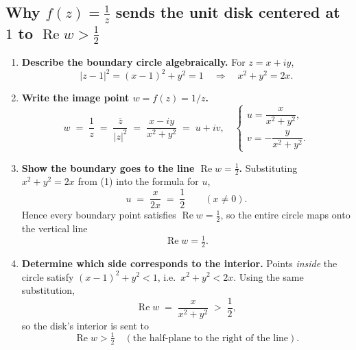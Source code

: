 \documentclass[12pt]{article}
\title{}
\author{Jerich Lee}
\date{\today}
\theoremstyle{definition} %
\theoremstyle{plain} %
\begin{document}
\maketitle

\subsection*{Why \(f(z)=\tfrac1z\) sends the unit disk centered at \(1\) to
\(\operatorname{Re} w > \tfrac12\)}

\begin{enumerate}
\item \textbf{Describe the boundary circle algebraically.}  
      For \(z=x+iy\),
      \[
        \lvert z-1\rvert^2 = (x-1)^2 + y^2 = 1
        \quad\Longrightarrow\quad
        x^2 + y^2 = 2x. \tag{1}
      \]

\item \textbf{Write the image point \(w=f(z)=1/z\).}  
      \[
        w \;=\; \frac1z \;=\; \frac{\bar z}{|z|^2} 
        \;=\; \frac{x-iy}{x^2+y^2}
        \;=\; u + iv,
        \quad
        \begin{cases}
          u = \dfrac{x}{x^2+y^2},\\[6pt]
          v = -\dfrac{y}{x^2+y^2}.
        \end{cases}
      \]

\item \textbf{Show the boundary goes to the line \(\operatorname{Re} w=\tfrac12\).}  
      Substituting \(x^2+y^2 = 2x\) from (1) into the formula for \(u\),
      \[
        u \;=\; \frac{x}{2x} \;=\; \frac12
        \qquad (x\neq 0).
      \]
      Hence every boundary point satisfies \(\operatorname{Re} w = \tfrac12\),
      so the entire circle maps onto the vertical line
      \[
        \boxed{\operatorname{Re} w = \tfrac12 }.
      \]

\item \textbf{Determine which side corresponds to the interior.}  
      Points \emph{inside} the circle satisfy \((x-1)^2 + y^2 < 1\),
      i.e.\ \(x^2 + y^2 < 2x\).  Using the same substitution,
      \[
        \operatorname{Re} w
        \;=\;
        \frac{x}{x^2+y^2}
        \;>\;
        \frac12,
      \]
      so the disk’s interior is sent to
      \[
        \boxed{\operatorname{Re} w > \tfrac12 } \quad
        (\text{the half-plane to the right of the line}).
      \]


\end{enumerate}
\end{document}
